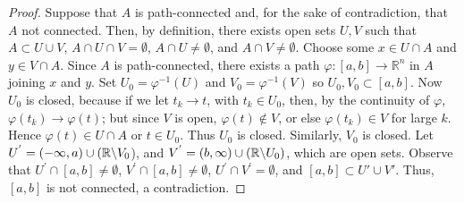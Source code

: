 \documentclass[11pt]{article}
\theoremstyle{definition}
\newcommand{\R}{\mathbb{R}}                      %
\begin{document}
\begin{proof}
Suppose that $A$ is path-connected and, for the sake of contradiction, that $A$ not connected. Then, by definition, there exists open sets $U,V$ such that $A\subset U\cup V$, $A\cap U \cap V= \emptyset$, $A\cap U \neq \emptyset$, and $A\cap V\neq\emptyset$. Choose some $x\in U\cap A$ and $y\in V\cap A$. Since $A$ is path-connected, there exists a path $\varphi:[a,b]\to\R^n$ in $A$ joining $x$ and $y$. Set $U_0=\varphi^{-1}(U)$ and $V_0=\varphi^{-1}(V)$ so $U_0,V_0\subset[a,b]$. Now $U_0$ is closed, because if we let $t_k\to t$, with $t_k\in U_0$, then, by the continuity of $\varphi$, $\varphi(t_k)\to \varphi(t)$; but since $V$ is open, $\varphi(t)\not\in V$, or else $\varphi(t_k)\in V$ for large $k$. Hence $\varphi(t)\in U\cap A$ or $t\in U_0$. Thus $U_0$ is closed. Similarly, $V_0$ is closed. Let $U^{'}=(-\infty,a)\cup (\R\symbol{92} V_0$), and $V^{'}=(b,\infty)\cup (\R\symbol{92} U_0)$, which are open sets. Observe that $U^{'}\cap [a,b]\neq\emptyset$, $V^{'}\cap[a,b]\neq\emptyset$, $U^{'}\cap V^{'}=\emptyset$, and $[a,b]\subset U'\cup V'$. Thus, $[a,b]$ is not connected, a contradiction.
\end{proof}
\end{document}
